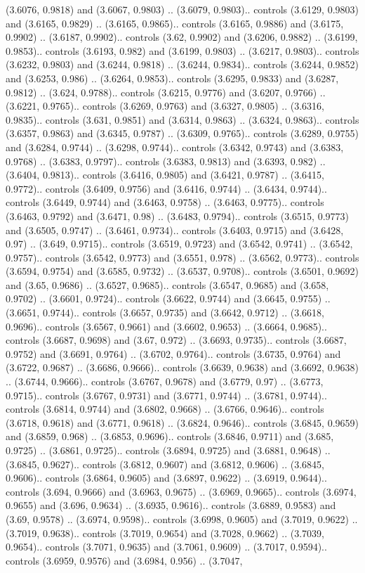 (3.6076, 0.9818) and (3.6067, 0.9803) .. (3.6079, 0.9803).. controls (3.6129, 0.9803) and (3.6165, 0.9829) .. (3.6165, 0.9865).. controls (3.6165, 0.9886) and (3.6175, 0.9902) .. (3.6187, 0.9902).. controls (3.62, 0.9902) and (3.6206, 0.9882) .. (3.6199, 0.9853).. controls (3.6193, 0.982) and (3.6199, 0.9803) .. (3.6217, 0.9803).. controls (3.6232, 0.9803) and (3.6244, 0.9818) .. (3.6244, 0.9834).. controls (3.6244, 0.9852) and (3.6253, 0.986) .. (3.6264, 0.9853).. controls (3.6295, 0.9833) and (3.6287, 0.9812) .. (3.624, 0.9788).. controls (3.6215, 0.9776) and (3.6207, 0.9766) .. (3.6221, 0.9765).. controls (3.6269, 0.9763) and (3.6327, 0.9805) .. (3.6316, 0.9835).. controls (3.631, 0.9851) and (3.6314, 0.9863) .. (3.6324, 0.9863).. controls (3.6357, 0.9863) and (3.6345, 0.9787) .. (3.6309, 0.9765).. controls (3.6289, 0.9755) and (3.6284, 0.9744) .. (3.6298, 0.9744).. controls (3.6342, 0.9743) and (3.6383, 0.9768) .. (3.6383, 0.9797).. controls (3.6383, 0.9813) and (3.6393, 0.982) .. (3.6404, 0.9813).. controls (3.6416, 0.9805) and (3.6421, 0.9787) .. (3.6415, 0.9772).. controls (3.6409, 0.9756) and (3.6416, 0.9744) .. (3.6434, 0.9744).. controls (3.6449, 0.9744) and (3.6463, 0.9758) .. (3.6463, 0.9775).. controls (3.6463, 0.9792) and (3.6471, 0.98) .. (3.6483, 0.9794).. controls (3.6515, 0.9773) and (3.6505, 0.9747) .. (3.6461, 0.9734).. controls (3.6403, 0.9715) and (3.6428, 0.97) .. (3.649, 0.9715).. controls (3.6519, 0.9723) and (3.6542, 0.9741) .. (3.6542, 0.9757).. controls (3.6542, 0.9773) and (3.6551, 0.978) .. (3.6562, 0.9773).. controls (3.6594, 0.9754) and (3.6585, 0.9732) .. (3.6537, 0.9708).. controls (3.6501, 0.9692) and (3.65, 0.9686) .. (3.6527, 0.9685).. controls (3.6547, 0.9685) and (3.658, 0.9702) .. (3.6601, 0.9724).. controls (3.6622, 0.9744) and (3.6645, 0.9755) .. (3.6651, 0.9744).. controls (3.6657, 0.9735) and (3.6642, 0.9712) .. (3.6618, 0.9696).. controls (3.6567, 0.9661) and (3.6602, 0.9653) .. (3.6664, 0.9685).. controls (3.6687, 0.9698) and (3.67, 0.972) .. (3.6693, 0.9735).. controls (3.6687, 0.9752) and (3.6691, 0.9764) .. (3.6702, 0.9764).. controls (3.6735, 0.9764) and (3.6722, 0.9687) .. (3.6686, 0.9666).. controls (3.6639, 0.9638) and (3.6692, 0.9638) .. (3.6744, 0.9666).. controls (3.6767, 0.9678) and (3.6779, 0.97) .. (3.6773, 0.9715).. controls (3.6767, 0.9731) and (3.6771, 0.9744) .. (3.6781, 0.9744).. controls (3.6814, 0.9744) and (3.6802, 0.9668) .. (3.6766, 0.9646).. controls (3.6718, 0.9618) and (3.6771, 0.9618) .. (3.6824, 0.9646).. controls (3.6845, 0.9659) and (3.6859, 0.968) .. (3.6853, 0.9696).. controls (3.6846, 0.9711) and (3.685, 0.9725) .. (3.6861, 0.9725).. controls (3.6894, 0.9725) and (3.6881, 0.9648) .. (3.6845, 0.9627).. controls (3.6812, 0.9607) and (3.6812, 0.9606) .. (3.6845, 0.9606).. controls (3.6864, 0.9605) and (3.6897, 0.9622) .. (3.6919, 0.9644).. controls (3.694, 0.9666) and (3.6963, 0.9675) .. (3.6969, 0.9665).. controls (3.6974, 0.9655) and (3.696, 0.9634) .. (3.6935, 0.9616).. controls (3.6889, 0.9583) and (3.69, 0.9578) .. (3.6974, 0.9598).. controls (3.6998, 0.9605) and (3.7019, 0.9622) .. (3.7019, 0.9638).. controls (3.7019, 0.9654) and (3.7028, 0.9662) .. (3.7039, 0.9654).. controls (3.7071, 0.9635) and (3.7061, 0.9609) .. (3.7017, 0.9594).. controls (3.6959, 0.9576) and (3.6984, 0.956) .. (3.7047, 